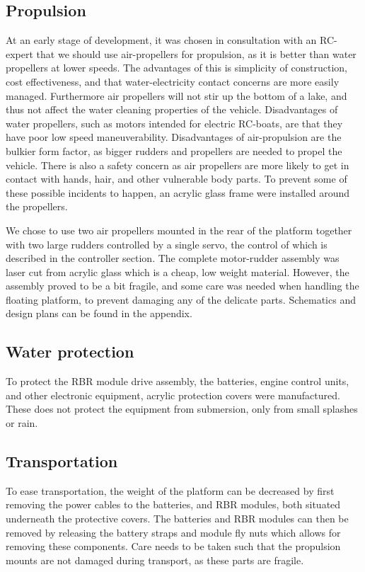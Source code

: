 \subsection{Propulsion}
At an early stage of development, it was chosen in consultation with an RC-expert that we should use air-propellers for propulsion, as it is better than water propellers at lower speeds. The advantages of this is simplicity of construction, cost effectiveness, and that water-electricity contact concerns are more easily managed. Furthermore air propellers will not stir up the bottom of a lake, and thus not affect the water cleaning properties of the vehicle.
Disadvantages of water propellers, such as motors intended for electric RC-boats, are that they have poor low speed maneuverability. Disadvantages of air-propulsion are the bulkier form factor, as bigger rudders and propellers are needed to propel the vehicle. There is also a safety concern as air propellers are more likely to get in contact with hands, hair, and other vulnerable body parts. To prevent some of these possible incidents to happen, an acrylic glass frame were installed around the propellers.

We chose to use two air propellers mounted in the rear of the platform together with two large rudders controlled by a single servo, the control of which is described in the controller section. The complete motor-rudder assembly was laser cut from acrylic glass which is a cheap, low weight material. However, the assembly proved to be a bit fragile, and some care was needed when handling the floating platform, to prevent damaging any of the delicate parts. Schematics and design plans can be found in the appendix.
\subsection{Water protection}
To protect the RBR module drive assembly, the batteries, engine control units, and other electronic equipment, acrylic protection covers were manufactured. These does not protect the equipment from submersion, only from small splashes or rain. 
\subsection{Transportation}
To ease transportation, the weight of the platform can be decreased by first removing the power cables to the batteries, and RBR modules, both situated underneath the protective covers. The batteries and RBR modules can then be removed by releasing the battery straps and module fly nuts which allows for removing these components. Care needs to be taken such that the propulsion mounts are not damaged during transport, as these parts are fragile.

